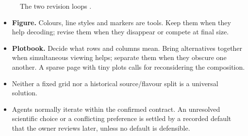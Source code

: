 \begin{figure}[H]
  \centering
  \caption{The two revision loops \cite[Design and iterate at two
      scales]{skill:plot-production}.}
  \label{fig:reports-loops}
\end{figure}

\begin{itemize}
  \item \textbf{Figure.} Colours, line styles and markers are tools. Keep them when they help
        decoding; revise them when they disappear or compete at final size.
  \item \textbf{Plotbook.} Decide what rows and columns mean. Bring alternatives together when
        simultaneous viewing helps; separate them when they obscure one another. A sparse page
        with tiny plots calls for reconsidering the composition.
  \item Neither a fixed grid nor a historical source/flavour split is a universal solution.
  \item Agents normally iterate within the confirmed contract. An unresolved scientific choice or
        a conflicting preference is settled by a recorded default that the owner reviews later,
        unless no default is defensible.
\end{itemize}

